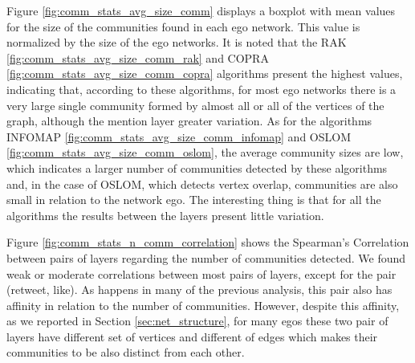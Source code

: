 Figure \ref{fig:comm_stats_avg_size_comm} displays a boxplot with mean values for the size of the communities found in each ego network. This value is normalized by the size of the ego networks. It is noted that the RAK \ref{fig:comm_stats_avg_size_comm_rak} and COPRA \ref{fig:comm_stats_avg_size_comm_copra} algorithms present the highest values, indicating that, according to these algorithms, for most ego networks there is a very large single community formed by almost all or all of the vertices of the graph, although the mention layer greater variation. As for the algorithms INFOMAP \ref{fig:comm_stats_avg_size_comm_infomap} and OSLOM \ref{fig:comm_stats_avg_size_comm_oslom}, the average community sizes are low, which indicates a larger number of communities detected by these algorithms and, in the case of OSLOM, which detects vertex overlap, communities are also small in relation to the network ego. The interesting thing is that for all the algorithms the results between the layers present little variation.



Figure \ref{fig:comm_stats_n_comm_correlation} shows the Spearman{'}s Correlation between pairs of layers regarding the number of communities detected. We found weak or moderate correlations between most pairs of layers, except for the pair (retweet, like). As happens in many of the previous analysis, this pair also has affinity in relation to the number of communities. However, despite this affinity, as we reported in Section \ref{sec:net_structure}, for many egos these two pair of layers have different set of vertices and different of edges which makes their communities to be also distinct from each other.  

